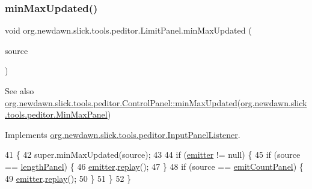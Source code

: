 \subsubsection{\texorpdfstring{min\+Max\+Updated()}{minMaxUpdated()}}
{\footnotesize\ttfamily void org.\+newdawn.\+slick.\+tools.\+peditor.\+Limit\+Panel.\+min\+Max\+Updated (\begin{DoxyParamCaption}\item[{\mbox{\hyperlink{classorg_1_1newdawn_1_1slick_1_1tools_1_1peditor_1_1_min_max_panel}{Min\+Max\+Panel}}}]{source }\end{DoxyParamCaption})\hspace{0.3cm}{\ttfamily [inline]}}

\begin{DoxySeeAlso}{See also}
\mbox{\hyperlink{classorg_1_1newdawn_1_1slick_1_1tools_1_1peditor_1_1_control_panel_ae8f9c3f55e43dad862c8520af7c3fac8}{org.\+newdawn.\+slick.\+tools.\+peditor.\+Control\+Panel\+::min\+Max\+Updated}}(\mbox{\hyperlink{classorg_1_1newdawn_1_1slick_1_1tools_1_1peditor_1_1_min_max_panel}{org.\+newdawn.\+slick.\+tools.\+peditor.\+Min\+Max\+Panel}}) 
\end{DoxySeeAlso}


Implements \mbox{\hyperlink{interfaceorg_1_1newdawn_1_1slick_1_1tools_1_1peditor_1_1_input_panel_listener_a2f2fda874b026dd19ca947af14bc65c0}{org.\+newdawn.\+slick.\+tools.\+peditor.\+Input\+Panel\+Listener}}.


\begin{DoxyCode}
41                                                   \{
42         super.minMaxUpdated(source);
43         
44         \textcolor{keywordflow}{if} (\mbox{\hyperlink{classorg_1_1newdawn_1_1slick_1_1tools_1_1peditor_1_1_control_panel_aaa170169fa574cb6b271f782afcd2517}{emitter}} != null) \{
45             \textcolor{keywordflow}{if} (source == \mbox{\hyperlink{classorg_1_1newdawn_1_1slick_1_1tools_1_1peditor_1_1_limit_panel_ad3bc8a56a885b464af5b4e62fa362ca1}{lengthPanel}}) \{
46                 \mbox{\hyperlink{classorg_1_1newdawn_1_1slick_1_1tools_1_1peditor_1_1_control_panel_aaa170169fa574cb6b271f782afcd2517}{emitter}}.\mbox{\hyperlink{classorg_1_1newdawn_1_1slick_1_1particles_1_1_configurable_emitter_a86bf563a92e8c12e4390f822e872c696}{replay}}();
47             \}
48             \textcolor{keywordflow}{if} (source == \mbox{\hyperlink{classorg_1_1newdawn_1_1slick_1_1tools_1_1peditor_1_1_limit_panel_a045b6429f6d14167c06956c97ca71e49}{emitCountPanel}}) \{
49                 \mbox{\hyperlink{classorg_1_1newdawn_1_1slick_1_1tools_1_1peditor_1_1_control_panel_aaa170169fa574cb6b271f782afcd2517}{emitter}}.\mbox{\hyperlink{classorg_1_1newdawn_1_1slick_1_1particles_1_1_configurable_emitter_a86bf563a92e8c12e4390f822e872c696}{replay}}();
50             \}
51         \}
52     \}
\end{DoxyCode}


